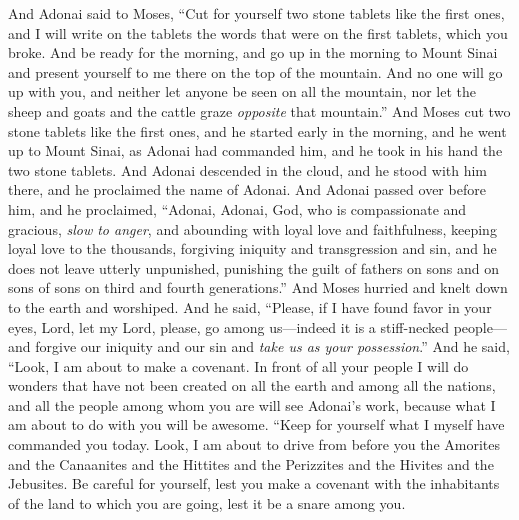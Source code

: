 \begin{biblechapter} %
 And Adonai said to Moses, “Cut for yourself two stone tablets like the first ones, and I will write on the tablets the words that were on the first tablets, which you broke.
\verse And be ready for the morning, and go up in the morning to Mount Sinai and present yourself to me there on the top of the mountain.
\verse And no one will go up with you, and neither let anyone be seen on all the mountain, nor let the sheep and goats and the cattle graze \textit{opposite} that mountain.”
\verse And Moses cut two stone tablets like the first ones, and he started early in the morning, and he went up to Mount Sinai, as Adonai had commanded him, and he took in his hand the two stone tablets.
\verse And Adonai descended in the cloud, and he stood with him there, and he proclaimed the name of Adonai.
\verse And Adonai passed over before him, and he proclaimed, “Adonai, Adonai, God, who is compassionate and gracious, \textit{slow to anger}, and abounding with loyal love and faithfulness,
\verse keeping loyal love to the thousands, forgiving iniquity and transgression and sin, and he does not leave utterly unpunished, punishing the guilt of fathers on sons and on sons of sons on third and fourth generations.”
\verse And Moses hurried and knelt down to the earth and worshiped.
\verse And he said, “Please, if I have found favor in your eyes, Lord, let my Lord, please, go among us—indeed it is a stiff-necked people—and forgive our iniquity and our sin and \textit{take us as your possession}.”
 And he said, “Look, I am about to make a covenant. In front of all your people I will do wonders that have not been created on all the earth and among all the nations, and all the people among whom you are will see Adonai’s work, because what I am about to do with you will be awesome.
\verse “Keep for yourself what I myself have commanded you today. Look, I am about to drive from before you the Amorites and the Canaanites and the Hittites and the Perizzites and the Hivites and the Jebusites.
\verse Be careful for yourself, lest you make a covenant with the inhabitants of the land to which you are going, lest it be a snare among you.

\end{biblechapter}
